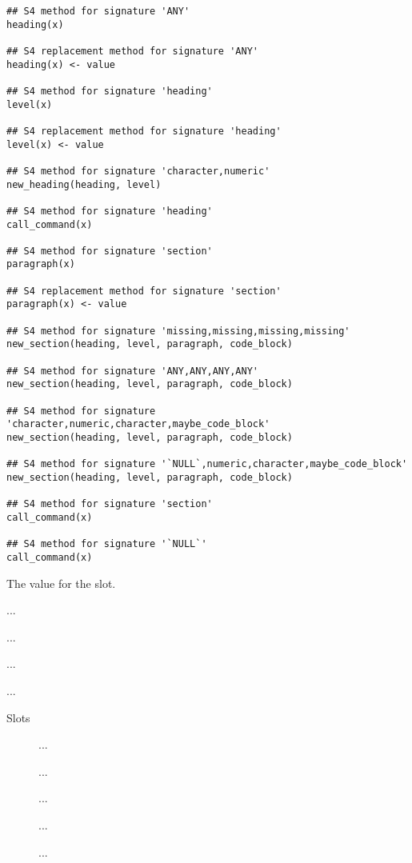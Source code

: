 \documentclass[letterpaper]{book}
\begin{document}
\begin{Usage}
\begin{verbatim}
## S4 method for signature 'ANY'
heading(x)

## S4 replacement method for signature 'ANY'
heading(x) <- value

## S4 method for signature 'heading'
level(x)

## S4 replacement method for signature 'heading'
level(x) <- value

## S4 method for signature 'character,numeric'
new_heading(heading, level)

## S4 method for signature 'heading'
call_command(x)

## S4 method for signature 'section'
paragraph(x)

## S4 replacement method for signature 'section'
paragraph(x) <- value

## S4 method for signature 'missing,missing,missing,missing'
new_section(heading, level, paragraph, code_block)

## S4 method for signature 'ANY,ANY,ANY,ANY'
new_section(heading, level, paragraph, code_block)

## S4 method for signature 'character,numeric,character,maybe_code_block'
new_section(heading, level, paragraph, code_block)

## S4 method for signature '`NULL`,numeric,character,maybe_code_block'
new_section(heading, level, paragraph, code_block)

## S4 method for signature 'section'
call_command(x)

## S4 method for signature '`NULL`'
call_command(x)
\end{verbatim}
\end{Usage}
%
\begin{Arguments}
\begin{ldescription}
\item[\code{value}] The value for the slot.

\item[\code{heading}] ...

\item[\code{level}] ...

\item[\code{paragraph}] ...

\item[\code{code\_block}] ...
\end{ldescription}
\end{Arguments}
%
\begin{Section}{Slots}

\begin{description}

\item[] ...

\item[] ...

\item[] ...

\item[] ...

\item[] ...

\end{description}
\end{Section}
\end{document}
